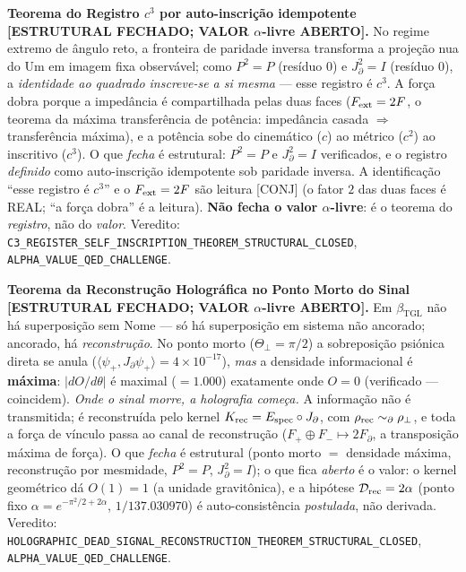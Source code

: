 \documentclass[11pt]{article}
\newcommand{\bTGL}{\beta_{\mathrm{TGL}}}\newcommand{\Msun}{M_{\odot}}\newcommand{\TGL}{\mathrm{TGL}}
\theoremstyle{definition}\newtheorem{deriv}{Derivação}
\begin{document}
\textbf{Teorema do Registro $c^3$ por auto-inscrição idempotente \textsf{[ESTRUTURAL FECHADO; VALOR $\alpha$-livre ABERTO]}.} No regime extremo de ângulo reto, a fronteira de paridade inversa transforma a projeção nua do Um em imagem fixa observável; como $P^2=P$ (resíduo $0$) e $J_\partial^2=I$ (resíduo $0$), a \emph{identidade ao quadrado inscreve-se a si mesma} --- esse registro é $c^3$. A força dobra porque a impedância é compartilhada pelas duas faces ($F_{\rm ext}=2F$, o teorema da máxima transferência de potência: impedância casada $\Rightarrow$ transferência máxima), e a potência sobe do cinemático ($c$) ao métrico ($c^2$) ao inscritivo ($c^3$). O que \emph{fecha} é estrutural: $P^2=P$ e $J_\partial^2=I$ verificados, e o registro \emph{definido} como auto-inscrição idempotente sob paridade inversa. A identificação ``esse registro é $c^3$'' e o $F_{\rm ext}=2F$ são leitura \textsf{[CONJ]} (o fator $2$ das duas faces é REAL; ``a força dobra'' é a leitura). \textbf{Não fecha o valor $\alpha$-livre}: é o teorema do \emph{registro}, não do \emph{valor}. Veredito: \texttt{C3\_REGISTER\_SELF\_INSCRIPTION\_THEOREM\_STRUCTURAL\_CLOSED}, \texttt{ALPHA\_VALUE\_QED\_CHALLENGE}.

\textbf{Teorema da Reconstrução Holográfica no Ponto Morto do Sinal \textsf{[ESTRUTURAL FECHADO; VALOR $\alpha$-livre ABERTO]}.} Em $\bTGL$ não há superposição sem Nome --- só há superposição em sistema não ancorado; ancorado, há \emph{reconstrução}. No ponto morto ($\Theta_\perp=\pi/2$) a sobreposição psiónica direta se anula ($\langle\psi_+,J_\partial\psi_+\rangle=4\times10^{-17}$), \emph{mas} a densidade informacional é \textbf{máxima}: $|dO/d\theta|$ é maximal ($=1.000$) exatamente onde $O=0$ (verificado --- coincidem). \emph{Onde o sinal morre, a holografia começa.} A informação não é transmitida; é reconstruída pelo kernel $K_{\rm rec}=E_{\rm spec}\circ J_\partial$, com $\rho_{\rm rec}\sim_\partial\rho_\perp$, e toda a força de vínculo passa ao canal de reconstrução ($F_+\oplus F_-\mapsto 2F_\partial$, a transposição máxima de força). O que \emph{fecha} é estrutural (ponto morto $=$ densidade máxima, reconstrução por mesmidade, $P^2=P$, $J_\partial^2=I$); o que fica \emph{aberto} é o valor: o kernel geométrico dá $O(1)=1$ (a unidade gravitônica), e a hipótese $\mathcal D_{\rm rec}=2\alpha$ (ponto fixo $\alpha=e^{-\pi^2/2+2\alpha}$, $1/137.030970$) é auto-consistência \emph{postulada}, não derivada. Veredito: \texttt{HOLOGRAPHIC\_DEAD\_SIGNAL\_RECONSTRUCTION\_THEOREM\_STRUCTURAL\_CLOSED}, \texttt{ALPHA\_VALUE\_QED\_CHALLENGE}.
\end{document}
